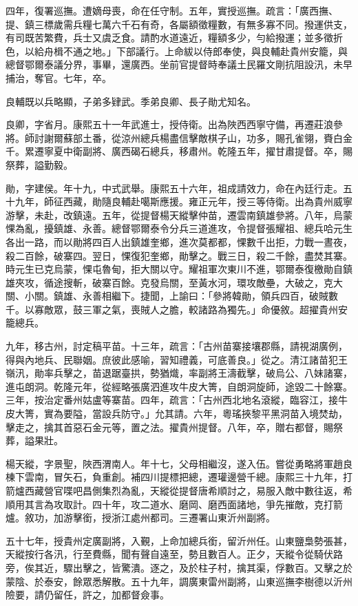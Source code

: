 \begin{pinyinscope}
四年，復署巡撫。遭嫡母喪，命在任守制。五年，實授巡撫。疏言：「廣西撫、提、鎮三標歲需兵糧七萬六千石有奇，各屬額徵糧數，有無多寡不同。撥運供支，有司既苦繁費，兵士又虞乏食。請酌水道遠近，糧額多少，勻給撥運；並多徵折色，以給舟楫不通之地。」下部議行。上命紱以侍郎奉使，與良輔赴貴州安籠，與總督鄂爾泰議分界，事畢，還廣西。坐前官提督時奉議土民羅文剛抗阻設汛，未早捕治，奪官。七年，卒。

良輔既以兵略顯，子弟多肄武。季弟良卿、長子勛尤知名。

良卿，字省月。康熙五十一年武進士，授侍衛。出為陜西西寧守備，再遷莊浪參將。師討謝爾蘇部土番，從涼州總兵楊盡信擊敵棋子山，功多，賜孔雀翎，賚白金千。累遷寧夏中衛副將、廣西碣石總兵，移肅州。乾隆五年，擢甘肅提督。卒，賜祭葬，謚勤毅。

勛，字建侯。年十九，中式武舉。康熙五十六年，祖成請效力，命在內廷行走。五十九年，師征西藏，勛隨良輔赴噶斯應援。雍正元年，授三等侍衛。出為貴州威寧游擊，未赴，改鎮遠。五年，從提督楊天縱擊仲苗，遷雲南鎮雄參將。八年，烏蒙惈為亂，擾鎮雄、永善。總督鄂爾泰令分兵三道進攻，令提督張耀祖、總兵哈元生各出一路，而以勛將四百人出鎮雄奎鄉，進次莫都都，惈數千出拒，力戰一晝夜，殺二百餘，破寨四。翌日，惈復犯奎鄉，勛擊之。戰三日，殺二千餘，盡焚其寨。時元生已克烏蒙，惈屯魯甸，拒大關以守。耀祖軍次東川不進，鄂爾泰復檄勛自鎮雄夾攻，循途搜斬，破寨百餘。克發烏關，至黃水河，環攻敵壘，大破之，克大關、小關。鎮雄、永善相繼下。捷聞，上諭曰：「參將韓勛，領兵四百，破賊數千。以寡敵眾，鼓三軍之氣，喪賊人之膽，較諸路為獨先。」命優敘。超擢貴州安籠總兵。

九年，移古州，討定稿平苗。十三年，疏言：「古州苗寨接壤郡縣，請視湖廣例，得與內地兵、民聯姻。庶彼此感喻，習知禮義，可底善良。」從之。清江諸苗犯王嶺汛，勛率兵擊之，苗退踞臺拱，勢猶熾，率副將王濤截擊，破烏公、八妹諸寨，進屯朗洞。乾隆元年，從經略張廣泗進攻牛皮大箐，自朗洞旋師，途毀二十餘寨。三年，按治定番州姑盧等寨苗。四年，疏言：「古州西北地名滾縱，臨容江，接牛皮大箐，實為要隘，當設兵防守。」允其請。六年，粵瑤挾黎平黑洞苗入境焚劫，擊走之，擒其首惡石金元等，置之法。擢貴州提督。八年，卒，贈右都督，賜祭葬，謚果壯。

楊天縱，字景聖，陜西渭南人。年十七，父母相繼沒，遂入伍。嘗從勇略將軍趙良棟下雲南，冒矢石，負重創。補四川提標把總，遷瓘邊營千總。康熙三十九年，打箭爐西藏營官喋吧昌側集烈為亂，天縱從提督唐希順討之，易服入敵中數往返，希順用其言為攻取計。四十年，攻二道水、磨岡、磨西面諸地，爭先摧敵，克打箭爐。敘功，加游擊銜，授浙江處州都司。三遷署山東沂州副將。

五十七年，授貴州定廣副將，入覲，上命加總兵銜，留沂州任。山東鹽梟勢張甚，天縱按行各汛，行至費縣，聞有聲自遠至，勢且數百人。正夕，天縱令從騎伏路旁，俟其近，驟出擊之，皆驚潰。逐之，及於柱子村，擒其渠，俘數百。又擊之於蒙陰、於泰安，餘眾悉解散。五十九年，調廣東雷州副將，山東巡撫李樹德以沂州險要，請仍留任，許之，加都督僉事。


\end{pinyinscope}

